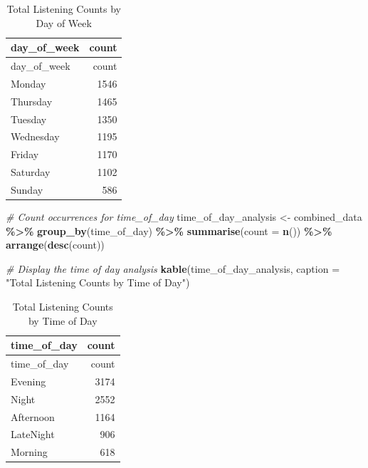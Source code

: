 \documentclass[
]{article}
\newenvironment{Shaded}{\begin{snugshade}}{\end{snugshade}}
\newcommand{\AttributeTok}[1]{\textcolor[rgb]{0.13,0.29,0.53}{#1}}
\newcommand{\CommentTok}[1]{\textcolor[rgb]{0.56,0.35,0.01}{\textit{#1}}}
\newcommand{\FunctionTok}[1]{\textcolor[rgb]{0.13,0.29,0.53}{\textbf{#1}}}
\newcommand{\NormalTok}[1]{#1}
\newcommand{\OtherTok}[1]{\textcolor[rgb]{0.56,0.35,0.01}{#1}}
\newcommand{\SpecialCharTok}[1]{\textcolor[rgb]{0.81,0.36,0.00}{\textbf{#1}}}
\newcommand{\StringTok}[1]{\textcolor[rgb]{0.31,0.60,0.02}{#1}}
\begin{document}
\begin{longtable}[]{@{}lr@{}}
\caption{Total Listening Counts by Day of Week}\tabularnewline
\toprule\noalign{}
day\_of\_week & count \\
\midrule\noalign{}
\endfirsthead
\toprule\noalign{}
day\_of\_week & count \\
\midrule\noalign{}
\endhead
\bottomrule\noalign{}
\endlastfoot
Monday & 1546 \\
Thursday & 1465 \\
Tuesday & 1350 \\
Wednesday & 1195 \\
Friday & 1170 \\
Saturday & 1102 \\
Sunday & 586 \\
\end{longtable}

\begin{Shaded}
\begin{Highlighting}[]
\CommentTok{\# Count occurrences for time\_of\_day}
\NormalTok{time\_of\_day\_analysis }\OtherTok{\textless{}{-}}\NormalTok{ combined\_data }\SpecialCharTok{\%\textgreater{}\%}
  \FunctionTok{group\_by}\NormalTok{(time\_of\_day) }\SpecialCharTok{\%\textgreater{}\%}
  \FunctionTok{summarise}\NormalTok{(}\AttributeTok{count =} \FunctionTok{n}\NormalTok{()) }\SpecialCharTok{\%\textgreater{}\%}
  \FunctionTok{arrange}\NormalTok{(}\FunctionTok{desc}\NormalTok{(count))}

\CommentTok{\# Display the time of day analysis}
\FunctionTok{kable}\NormalTok{(time\_of\_day\_analysis, }\AttributeTok{caption =} \StringTok{"Total Listening Counts by Time of Day"}\NormalTok{)}
\end{Highlighting}
\end{Shaded}

\begin{longtable}[]{@{}lr@{}}
\caption{Total Listening Counts by Time of Day}\tabularnewline
\toprule\noalign{}
time\_of\_day & count \\
\midrule\noalign{}
\endfirsthead
\toprule\noalign{}
time\_of\_day & count \\
\midrule\noalign{}
\endhead
\bottomrule\noalign{}
\endlastfoot
Evening & 3174 \\
Night & 2552 \\
Afternoon & 1164 \\
LateNight & 906 \\
Morning & 618 \\
\end{longtable}
\end{document}
